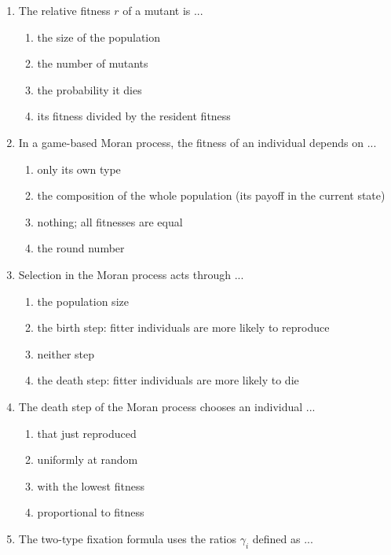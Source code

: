 \documentclass[11pt]{article}
\begin{document}
\begin{enumerate}[itemsep=6pt]
  \begin{enumerate}
    \item \(1 - 1/r\), which is bounded away from 1
    \item \(1\)
    \item \(1/N\)
    \item \(0\)
  \end{enumerate}
  \item The relative fitness \(r\) of a mutant is ...
  \begin{enumerate}
    \item the size of the population
    \item the number of mutants
    \item the probability it dies
    \item its fitness divided by the resident fitness
  \end{enumerate}
  \item In a game-based Moran process, the fitness of an individual depends on ...
  \begin{enumerate}
    \item only its own type
    \item the composition of the whole population (its payoff in the current state)
    \item nothing; all fitnesses are equal
    \item the round number
  \end{enumerate}
  \item Selection in the Moran process acts through ...
  \begin{enumerate}
    \item the population size
    \item the birth step: fitter individuals are more likely to reproduce
    \item neither step
    \item the death step: fitter individuals are more likely to die
  \end{enumerate}
  \item The death step of the Moran process chooses an individual ...
  \begin{enumerate}
    \item that just reproduced
    \item uniformly at random
    \item with the lowest fitness
    \item proportional to fitness
  \end{enumerate}
  \item The two-type fixation formula uses the ratios \(\gamma_i\) defined as ...

\end{enumerate}
\end{document}
